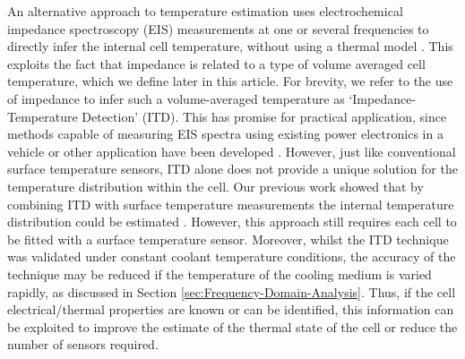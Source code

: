\documentclass[journal, english]{IEEEtran}
\begin{document}
An alternative approach to temperature estimation uses electrochemical
impedance spectroscopy (EIS) measurements at one or several frequencies to
directly infer the internal cell temperature, without using a thermal
model \cite{Srinivasan2012a,Schmidt2013a,Raijmakers2014d,Srinivasan2011c,Zhu2015}. This exploits the fact that impedance is related to a type of volume averaged cell temperature, which we define later in this article. 
For brevity, we refer to the use of impedance to infer such a volume-averaged temperature as `Impedance-Temperature Detection' (ITD). This has promise for practical application, since methods capable of measuring EIS spectra using
existing power electronics in a vehicle or other application have been developed
\cite{Howey2014a,Brandon2012,Huang2014c}. However, just like conventional
surface temperature sensors, ITD alone does not provide a unique solution
for the temperature distribution within the cell. Our previous work
showed that by combining ITD with surface temperature measurements
the internal temperature distribution could be estimated \cite{Richardson2014}.
However, this approach still requires each cell to be fitted with a surface temperature sensor.
Moreover, whilst the ITD technique was validated under
constant coolant temperature conditions, the accuracy of the technique
may be reduced if the temperature of the cooling medium is varied
rapidly, as discussed in Section \ref{sec:Frequency-Domain-Analysis}.
Thus, if the cell electrical/thermal properties are known or can be
identified, this information can be exploited to improve
the estimate of the thermal state of the cell or reduce the number of sensors required.
\end{document}
